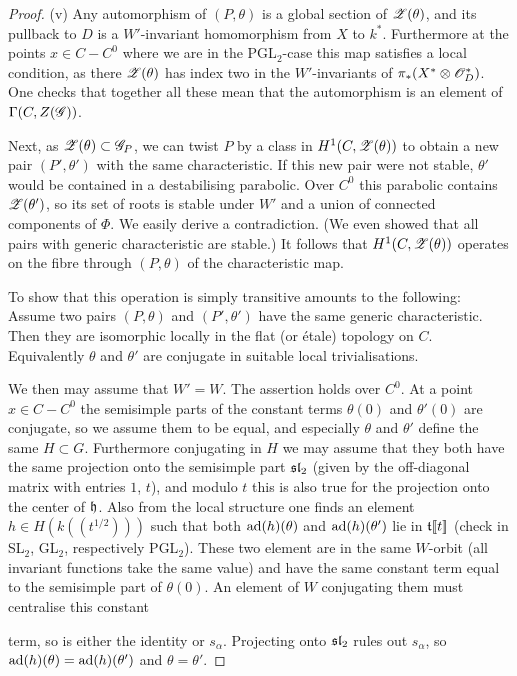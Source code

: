 \documentclass[12pt,english]{smfart}
\theoremstyle{plain} \newtheorem{innerthm}{Theorem} \newtheorem{innerlem}{Lemma} \newtheorem{innerprop}{Proposition} \newtheorem{innercor}{Corollary} \theoremstyle{definition} \newtheorem{innerdefn}{Definition} \newtheorem{innerconstr}{Construction} \theoremstyle{remark} \newtheorem*{remark}{Remark} \newtheorem*{remarks}{Remarks} \newtheorem*{applications}{Applications}
\begin{document}
\begin{proof}
(v) Any automorphism of $(P,\theta)$ is a global section of $\mathscr{Z}(\theta)$, and its pullback to $D$ is a $W'$-invariant homomorphism from $X$ to $k^*$. Furthermore at the points $x\in C-C^0$ where we are in the PGL$_2$-case this map satisfies a local condition, as there $\mathscr{Z}(\theta)$ has index two in the $W'$-invariants of $\pi_*(X^*\otimes\mathscr{O}_D^*)$. One checks that together all these mean that the automorphism is an element of $\Gamma(C,Z(\mathscr{G}))$.

Next, as $\mathscr{Z}(\theta)\subset\mathscr{G}_P$, we can twist $P$ by a class in $H^1(C,\mathscr{Z}(\theta))$ to obtain a new pair $(P',\theta')$ with the same characteristic. If this new pair were not stable, $\theta'$ would be contained in a destabilising parabolic. Over $C^0$ this parabolic contains $\mathscr{Z}(\theta')$, so its set of roots is stable under $W'$ and a union of connected components of $\Phi$. We easily derive a contradiction. (We even showed that all pairs with generic characteristic are stable.) It follows that $H^1(C,\mathscr{Z}(\theta))$ operates on the fibre through $(P,\theta)$ of the characteristic map.

To show that this operation is simply transitive amounts to the following: Assume two pairs $(P,\theta)$ and $(P',\theta')$ have the same generic characteristic. Then they are isomorphic locally in the flat (or \'etale) topology on $C$. Equivalently $\theta$ and $\theta'$ are conjugate in suitable local trivialisations.

We then may assume that $W'=W$. The assertion holds over $C^0$. At a point $x\in C-C^0$ the semisimple parts of the constant terms $\theta(0)$ and $\theta'(0)$ are conjugate, so we assume them to be equal, and especially $\theta$ and $\theta'$ define the same $H\subset G$. Furthermore conjugating in $H$ we may assume that they both have the same projection onto the semisimple part $\mathfrak{sl}_2$ (given by the off-diagonal matrix with entries $1$, $t$), and modulo $t$ this is also true for the projection onto the center of $\mathfrak{h}$. Also from the local structure one finds an element $h\in H(k((t^{1/2})))$ such that both $\operatorname{ad}(h)(\theta)$ and $\operatorname{ad}(h)(\theta')$ lie in $\mathfrak{t}[\![t]\!]$ (check in SL$_2$, GL$_2$, respectively PGL$_2$). These two element are in the same $W$-orbit (all invariant functions take the same value) and have the same constant term equal to the semisimple part of $\theta(0)$. An element of $W$ conjugating them must centralise this constant


term, so is either the identity or $s_\alpha$. Projecting onto $\mathfrak{sl}_2$ rules out $s_\alpha$, so $\operatorname{ad}(h)(\theta)=\operatorname{ad}(h)(\theta')$ and $\theta=\theta'$.


\end{proof}
\end{document}
